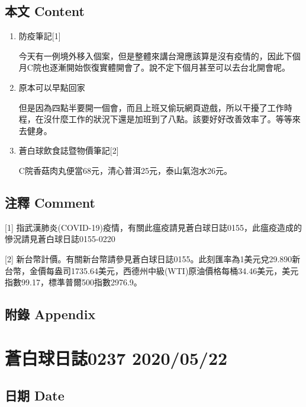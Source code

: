 \documentclass[a5paper, 11pt
]{book}
\begin{document}
\hypertarget{ux672cux6587-content-81}{%
\subsection{本文 Content}\label{ux672cux6587-content-81}}

\begin{enumerate}
\def\labelenumi{\arabic{enumi}.}
\item
  防疫筆記{[}1{]}

  今天有一例境外移入個案，但是整體來講台灣應該算是沒有疫情的，因此下個月C院也逐漸開始恢復實體開會了。說不定下個月甚至可以去台北開會呢。
\item
  原本可以早點回家

  但是因為四點半要開一個會，而且上班又偷玩網頁遊戲，所以干擾了工作時程，在沒什麼工作的狀況下還是加班到了八點。該要好好改善效率了。等等來去健身。
\item
  蒼白球飲食誌暨物價筆記{[}2{]}

  C院香菇肉丸便當68元，清心普洱25元，泰山氣泡水26元。
\end{enumerate}

\hypertarget{ux6ce8ux91cb-comment-81}{%
\subsection{注釋 Comment}\label{ux6ce8ux91cb-comment-81}}

{[}1{]}
指武漢肺炎(COVID-19)疫情，有關此瘟疫請見蒼白球日誌0155，此瘟疫造成的慘況請見蒼白球日誌0155-0220

{[}2{]}
新台幣計價。有關新台幣請參見蒼白球日誌0155。此刻匯率為1美元兌29.890新台幣，金價每盎司1735.64美元，西德州中級(WTI)原油價格每桶34.46美元，美元指數99.17，標準普爾500指數2976.9。

\hypertarget{ux9644ux9304-appendix-81}{%
\subsection{附錄 Appendix}\label{ux9644ux9304-appendix-81}}

\hypertarget{ux84bcux767dux7403ux65e5ux8a8c0237-20200522}{%
\section{蒼白球日誌0237
2020/05/22}\label{ux84bcux767dux7403ux65e5ux8a8c0237-20200522}}

\hypertarget{ux65e5ux671f-date-82}{%
\subsection{日期 Date}\label{ux65e5ux671f-date-82}}
\end{document}
